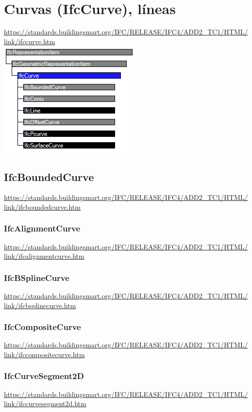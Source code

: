 \documentclass[spanish,12pt,a4paper,final,oneside]{book}
\begin{document}
\section{Curvas (IfcCurve), líneas}
\url{https://standards.buildingsmart.org/IFC/RELEASE/IFC4/ADD2_TC1/HTML/link/ifccurve.htm}
\\ \includegraphics[scale=1]{jerarquia de IfcCurve}




\subsection{IfcBoundedCurve}
\url{https://standards.buildingsmart.org/IFC/RELEASE/IFC4/ADD2_TC1/HTML/link/ifcboundedcurve.htm}


\subsubsection{IfcAlignmentCurve}
\url{https://standards.buildingsmart.org/IFC/RELEASE/IFC4/ADD2_TC1/HTML/link/ifcalignmentcurve.htm}

\subsubsection{IfcBSplineCurve}
\url{https://standards.buildingsmart.org/IFC/RELEASE/IFC4/ADD2_TC1/HTML/link/ifcbsplinecurve.htm}

\subsubsection{IfcCompositeCurve}
\url{https://standards.buildingsmart.org/IFC/RELEASE/IFC4/ADD2_TC1/HTML/link/ifccompositecurve.htm}

\subsubsection{IfcCurveSegment2D}
\url{https://standards.buildingsmart.org/IFC/RELEASE/IFC4/ADD2_TC1/HTML/link/ifccurvesegment2d.htm}
\end{document}
